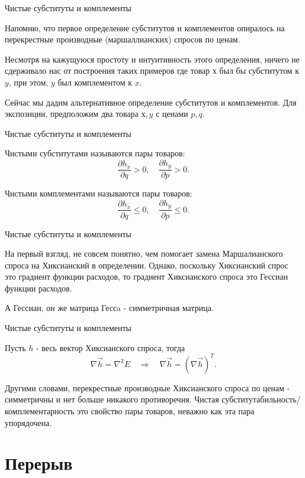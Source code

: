 \documentclass{beamer}
\begin{document}
\begin{frame}{Чистые субституты и комплементы}

Напомню, что первое определение субститутов и комплементов опиралось на перекрестные производные (маршаллианских) спросов по ценам. 

Несмотря на кажущуюся простоту и интуитивность этого определения, ничего не сдерживало нас от построения таких примеров где товар $х$ был бы субститутом к $y$, при этом, $y$ был комплементом к $x$.

Сейчас мы дадим альтернативное определение субститутов и комплементов. Для экспозиции, предположим два товара $х,y$ с ценами $p,q$.
\end{frame}

\begin{frame}{Чистые субституты и комплементы}

\begin{definition}
Чистыми субститутами называются пары товаров:
$$
\frac{\partial h_x}{\partial q} > 0, \quad \frac{\partial h_y}{\partial p} > 0.
$$

Чистыми комплементами называются пары товаров: 
$$
\frac{\partial h_x}{\partial q} \leqslant 0, \quad \frac{\partial h_y}{\partial p} \leqslant 0.
$$
\end{definition}

\end{frame}

\begin{frame}{Чистые субституты и комплементы}

На первый взгляд, не совсем понятно, чем помогает замена Маршалианского спроса на Хиксианский в определении. Однако, поскольку Хиксианский спрос это градиент функции расходов, то градиент Хиксианского спроса это Гессиан функции расходов. 

А Гессиан, он же матрица Гессa - симметричная матрица.

\end{frame}

\begin{frame}{Чистые субституты и комплементы}

\begin{lemma}
Пусть $h$ - весь вектор Хиксианского спроса, тогда
$$ \nabla \vec h = \nabla^2 E \quad \Rightarrow \quad \nabla \vec h = (\nabla \vec h)^T.$$
\end{lemma}

Другими словами, перекрестные производные Хиксианского спроса по ценам - симметричны и нет больше никакого противоречия. Чистая субститутабильность/комплементарность это свойство пары товаров, неважно как эта пара упорядочена.

\end{frame}

\section{Перерыв}
\end{document}
